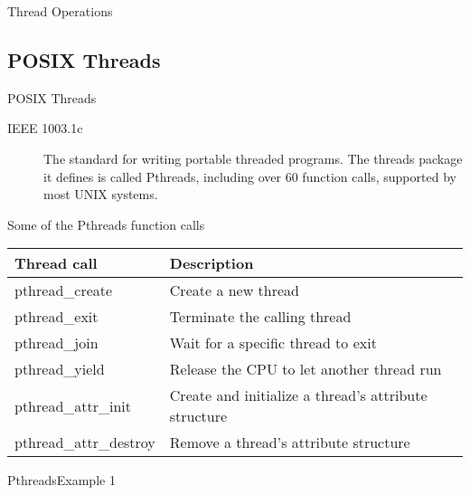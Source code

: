 \begin{frame}{Thread Operations}
  \begin{center}
  \end{center}
\end{frame}

\subsection{POSIX Threads}
\label{sec:posix-threads}

\begin{frame}{POSIX Threads}
  \begin{description}
  \item[IEEE 1003.1c] The standard for writing portable threaded programs. The threads package it
    defines is called \alert{Pthreads}, including over 60 function calls, supported by most UNIX
    systems.
  \end{description}
  \begin{block}{Some of the Pthreads function calls}
    \begin{center}
      \begin{small}
        \begin{tabularx}{\textwidth}{>{\ttfamily}lX}
          \toprule
          \textbf{Thread call}&\textbf{Description}\\\midrule
          pthread\_create&Create a new thread\\
          pthread\_exit&Terminate the calling thread\\
          pthread\_join&Wait for a specific thread to exit\\
          pthread\_yield&Release the CPU to let another thread run\\
          pthread\_attr\_init&Create and initialize a thread's attribute structure\\
          pthread\_attr\_destroy&Remove a thread's attribute structure\\\bottomrule
        \end{tabularx}
      \end{small}
    \end{center}
  \end{block}
\end{frame}

\begin{frame}{Pthreads}{Example 1}
\end{frame}

